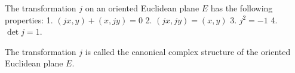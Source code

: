 The transformation $j$ on an oriented Euclidean plane $E$ has the following properties:
1. $(jx, y) + (x, jy) = 0$
2. $(jx, jy) = (x, y)$
3. $j^2 = -1$
4. $\det j = 1$.

The transformation $j$ is called the canonical complex structure of the oriented Euclidean plane $E$.
